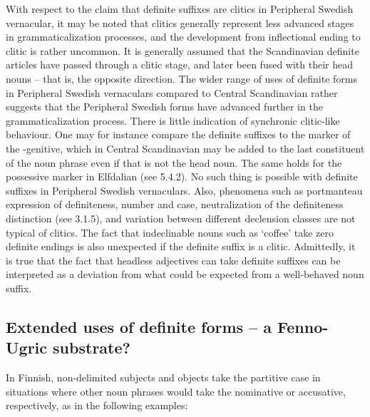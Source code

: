 With respect to the claim that definite suffixes are clitics in Peripheral Swedish vernacular, it may be noted that clitics generally represent less advanced stages in grammaticalization processes, and the development from inflectional ending to clitic is rather uncommon. It is generally assumed that the Scandinavian definite articles have passed through a clitic stage, and later been fused with their head nouns – that is, the opposite direction. The wider range of uses of definite forms in Peripheral Swedish vernaculars compared to Central Scandinavian rather suggests that the Peripheral Swedish forms have advanced further in the grammaticalization process. There is little indication of synchronic clitic-like behaviour. One may for instance compare the definite suffixes to the marker of the -genitive, which in Central Scandinavian may be added to the last constituent of the noun phrase even if that is not the head noun. The same holds for the possessive marker  in Elfdalian (see 5.4.2). No such thing is possible with definite suffixes in Peripheral Swedish vernaculars. Also, phenomena such as portmanteau expression of definiteness, number and case, neutralization of the definiteness distinction (see 3.1.5), and variation between different declension classes are not typical of clitics. The fact that indeclinable nouns such as  ‘coffee’ take zero definite endings is also unexpected if the definite suffix is a clitic. Admittedly, it is true that the fact that headless adjectives can take definite suffixes can be interpreted as a deviation from what could be expected from a well-behaved noun suffix.


\subsection{ Extended uses of definite forms – a Fenno-Ugric substrate?}

In Finnish, non-delimited subjects and objects take the partitive case in situations where other noun phrases would take the nominative or accusative, respectively, as in the following examples:


